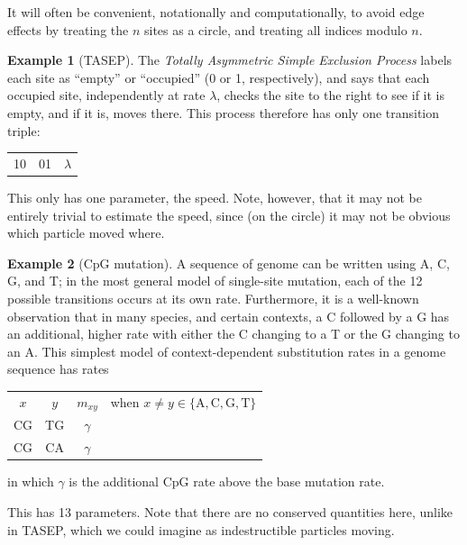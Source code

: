 \documentclass{article}
\newcommand{\nA}{\mbox{A}}  %
\newcommand{\nC}{\mbox{C}}
\newcommand{\nG}{\mbox{G}}
\newcommand{\nT}{\mbox{T}}
\theoremstyle{plain}
\theoremstyle{definition}
\newtheorem{example}{Example}[section]
\begin{document}
It will often be convenient, notationally and computationally, to avoid edge effects
by treating the $n$ sites as a circle, and treating all indices modulo $n$.

\begin{example}[TASEP]
  The \emph{Totally Asymmetric Simple Exclusion Process} labels each site as ``empty'' or ``occupied'' (0 or 1, respectively),
  and says that each occupied site, independently at rate $\lambda$, checks the site to the right to see if it is empty,
  and if it is, moves there.
  This process therefore has only one transition triple:

  \begin{center}
    \begin{tabular}{c@{\quad$\to$\quad}c@{\quad at rate\quad }c}
      10  &   01   &  $\lambda$
    \end{tabular}
  \end{center}

  This only has one parameter, the speed.
  Note, however, that it may not be entirely trivial to estimate the speed,
  since (on the circle) it may not be obvious which particle moved where.

\end{example}

\begin{example}[CpG mutation]
  A sequence of genome can be written using A, C, G, and T;
  in the most general model of single-site mutation, each of the 12 possible transitions occurs at its own rate.
  Furthermore, it is a well-known observation that in many species, and certain contexts,
  a C followed by a G has an additional, higher rate with either the C changing to a T or the G changing to an A.
  This simplest model of context-dependent substitution rates in a genome sequence has rates

  \begin{center}
    \begin{tabular}{c@{\quad$\to$\quad}c@{\quad at rate\quad }cc}
      $x$  &  $y$  &  $m_{xy}$ & when $x \neq y \in \{\nA,\nC,\nG,\nT\}$  \\
      CG   &  TG   &  $\gamma$ & \\
      CG   &  CA   &  $\gamma$ &
    \end{tabular}
  \end{center}
  in which $\gamma$ is the additional CpG rate above the base mutation rate.

  This has 13 parameters.
  Note that there are no conserved quantities here, unlike in TASEP,
  which we could imagine as indestructible particles moving.


\end{example}
\end{document}
